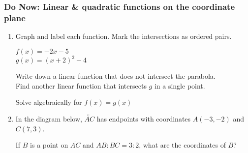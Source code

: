 \documentclass[12pt, twoside]{article}
\begin{document}
\subsubsection*{Do Now: Linear \& quadratic functions on the coordinate plane}
  \begin{enumerate}

    \item Graph and label each function. Mark the intersections as ordered pairs.
            \vspace{0.25cm}
            \begin{multicols}{2}
              $f(x)=-2x-5$\\
              $g(x)=(x+2)^2-4$
            \end{multicols}
            Write down a linear function that does not intersect the parabola.\\[1cm]
            Find another linear function that intersects $g$ in a single point.
            \vspace{1cm}

        \begin{center} %
        \end{center}
        Solve algebraically for $f(x)=g(x)$

\newpage
    \item In the diagram below, $\overleftrightarrow{AC}$ has endpoints with coordinates $A(-3,-2)$ and $C(7, 3)$.
      \begin{center} %
      \end{center}
      If $B$ is a point on $\overline{AC}$ and $AB {:} BC = 3{:}2$,  what  are  the coordinates of $B$?

\end{enumerate}
\end{document}
